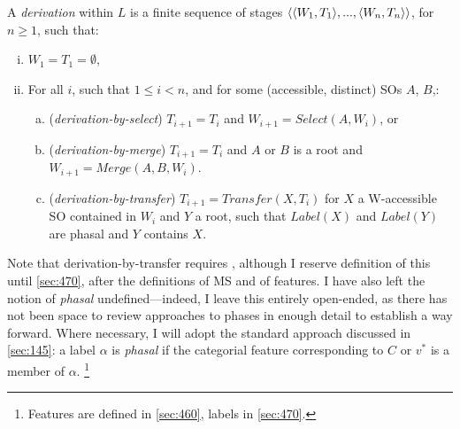 \begin{definition}\label{def:derivation:2}
    A \textit{derivation} within $L$ is a finite sequence of stages $\langle \langle W_{1},T_{1} \rangle, ..., \langle W_{n},T_{n} \rangle \rangle$, for $n \geq 1$, such that:
    \begin{enumerate}[(i)]
        \item $W_1 = T_1 = \emptyset$,
        \item For all $i$, such that $1 \leq i < n$, and for some (accessible, distinct) SOs $A$, $B$,:
        \begin{enumerate}[(a)]

            \item (\textit{derivation-by-select}) $T_{i+1} = T_i$ and $W_{i+1} = Select(A, W_i)$, or

            \item (\textit{derivation-by-merge}) $T_{i+1} = T_i$ and $A$ or $B$ is a root and $W_{i+1} = Merge(A, B, W_i)$.

            \item (\textit{derivation-by-transfer}) $T_{i+1} = Transfer(X, T_i)$ for $X$ a W-accessible SO contained in $W_i$ and $Y$ a root, such that $Label(X)$ and $Label(Y)$ are phasal and $Y$ contains $X$.

        \end{enumerate}
    \end{enumerate}
\end{definition}

Note that derivation-by-transfer requires \Label, although I reserve definition of this until \autoref{sec:470}, after the definitions of MS and of features. I have also left the notion of \textit{phasal} undefined---indeed, I leave this entirely open-ended, as there has not been space to review approaches to phases in enough detail to establish a way forward. Where necessary, I will adopt the standard approach discussed in \autoref{sec:145}: a label $\alpha$ is \textit{phasal} if the categorial feature corresponding to $C$ or $v^*$ is a member of $\alpha$.%
\footnote{Features are defined in \autoref{sec:460}, labels in \autoref{sec:470}.}

